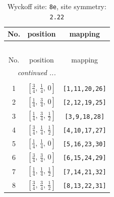 \documentclass[fleqn,8pt]{jsarticle}
\begin{document}
\renewcommand{\arraystretch}{1.2}
\begin{longtable}{ccc}
\caption{Wyckoff site: {\tt 8e}, site symmetry: {\tt 2.22}}
 \\
 \hline \hline
No. & position & mapping \\ \hline \endfirsthead

\multicolumn{2}{l}{\tablename\ \thetable{}} \\
 \hline \hline
No. & position & mapping \\ \hline \endhead

 \hline \hline
\multicolumn{2}{r}{\footnotesize\it continued ...} \\ \endfoot

 \hline \hline
\multicolumn{2}{r}{} \\ \endlastfoot

1 & $\left[ \frac{3}{4},\, \frac{1}{4},\, 0 \right]$ & {\tt [1,11,20,26]} \\ \hline
2 & $\left[ \frac{1}{4},\, \frac{3}{4},\, 0 \right]$ & {\tt [2,12,19,25]} \\ \hline
3 & $\left[ \frac{1}{4},\, \frac{3}{4},\, \frac{1}{2} \right]$ & {\tt [3,9,18,28]} \\ \hline
4 & $\left[ \frac{3}{4},\, \frac{1}{4},\, \frac{1}{2} \right]$ & {\tt [4,10,17,27]} \\ \hline
5 & $\left[ \frac{1}{4},\, \frac{1}{4},\, 0 \right]$ & {\tt [5,16,23,30]} \\ \hline
6 & $\left[ \frac{3}{4},\, \frac{3}{4},\, 0 \right]$ & {\tt [6,15,24,29]} \\ \hline
7 & $\left[ \frac{1}{4},\, \frac{1}{4},\, \frac{1}{2} \right]$ & {\tt [7,14,21,32]} \\ \hline
8 & $\left[ \frac{3}{4},\, \frac{3}{4},\, \frac{1}{2} \right]$ & {\tt [8,13,22,31]} \\
\end{longtable}
\renewcommand{\arraystretch}{1.2}
\end{document}

